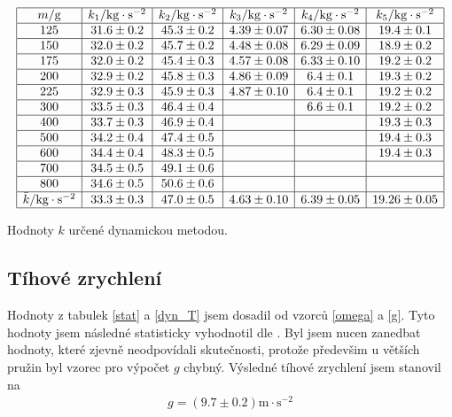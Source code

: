 \documentclass[a4paper,12pt]{article}
\begin{document}
\begin{table}
$$
\begin{array}{|c|c|c|c|c|c|}
\hline
m/\mbox{g}&	k_1/\mbox{kg}\cdot\mbox{s}^{-2}&	k_2/\mbox{kg}\cdot\mbox{s}^{-2}&	k_3/\mbox{kg}\cdot\mbox{s}^{-2}&	k_4/\mbox{kg}\cdot\mbox{s}^{-2}&	k_5/\mbox{kg}\cdot\mbox{s}^{-2}	\\ \hline	
125&	31.6\pm 0.2&	45.3\pm 0.2&	4.39\pm 0.07&	6.30\pm 0.08&	19.4\pm 0.1	\\ \hline
150&	32.0\pm 0.2&	45.7\pm 0.2&	4.48\pm 0.08&	6.29\pm 0.09&	18.9\pm 0.2	\\ \hline
175&	32.0\pm 0.2&	45.4\pm 0.3&	4.57\pm 0.08&	6.33\pm 0.10&	19.2\pm 0.2	\\ \hline
200&	32.9\pm 0.2&	45.8\pm 0.3&	4.86\pm 0.09&	6.4\pm 0.1&	19.3\pm 0.2	\\ \hline
225&	32.9\pm 0.3&	45.9\pm 0.3&	4.87\pm 0.10&	6.4\pm 0.1&	19.2\pm 0.2	\\ \hline
300&	33.5\pm 0.3&	46.4\pm 0.4&		&	6.6\pm 0.1&	19.2\pm 0.2	\\ \hline
400&	33.7\pm 0.3&	46.9\pm 0.4&		&	&		19.3\pm 0.3	\\ \hline
500&	34.2\pm 0.4&	47.4\pm 0.5&		&	&		19.4\pm 0.3	\\ \hline
600&	34.4\pm 0.4&	48.3\pm 0.5&		&	&		19.4\pm 0.3	\\ \hline
700&	34.5\pm 0.5&	49.1\pm 0.6&		&	&				\\ \hline
800&	34.6\pm 0.5&	50.6\pm 0.6&		&	&				\\ \hline
\bar k/\mbox{kg}\cdot\mbox{s}^{-2}&	33.3\pm 0.3&	47.0\pm 0.5&	4.63\pm 0.10&	6.39\pm 0.05&	19.26\pm 0.05 \\ \hline		
\end{array}
$$
\caption{Hodnoty $k$ určené dynamickou metodou.}
\label{dyn_k}
\end{table}

\subsection{Tíhové zrychlení}
\noindent
Hodnoty z tabulek \ref{stat} a \ref{dyn_T} jsem dosadil od vzorců \ref{omega} a \ref{g}. Tyto hodnoty jsem následné 
statisticky vyhodnotil dle \cite{chyba}. Byl jsem nucen zanedbat hodnoty, které zjevně neodpovídali skutečnosti, 
protože předevšim u větších pružin byl vzorec pro výpočet $g$ chybný.  Výsledné tíhové zrychlení jsem stanovil na
\begin{eqnarray}
	g=(9.7\pm0.2)\mbox{m}\cdot\mbox{s}^{-2}
\end{eqnarray}
\end{document}
